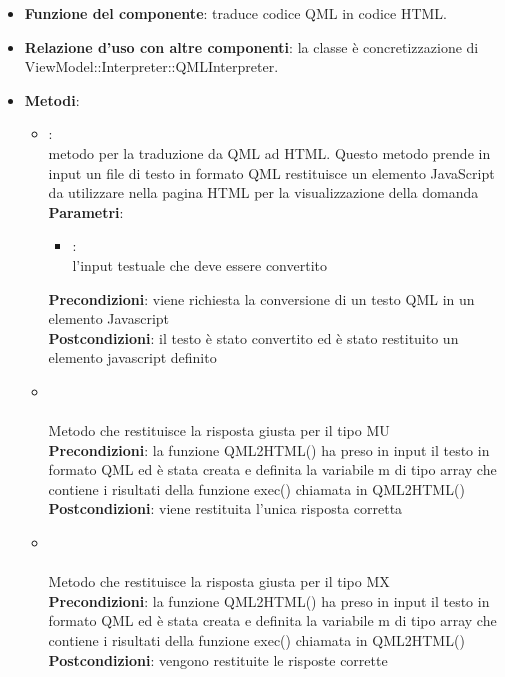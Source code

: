 \begin{itemize}
	\item\textbf{Funzione del componente}: traduce codice QML in codice HTML.
	\item\textbf{Relazione d'uso con altre componenti}: la classe è concretizzazione di\\ ViewModel::Interpreter::QMLInterpreter.\\
	\item\textbf{Metodi}:
	\begin{itemize}
		\item{}:\\
		 metodo per la traduzione da QML ad HTML. Questo metodo prende in input un file di testo in formato QML restituisce un elemento JavaScript da utilizzare nella pagina HTML per la visualizzazione della domanda \\
		\textbf{Parametri}:
			\begin{itemize}
				\item{}:\\
				 l'input testuale che deve essere convertito \\
			\end{itemize}
		\textbf{Precondizioni}: viene richiesta la conversione di un testo QML in un elemento Javascript\\
		\textbf{Postcondizioni}: il testo è stato convertito ed è stato restituito un elemento javascript definito\\
		\item{}\\
		 \\Metodo che restituisce la risposta giusta per il tipo MU\\
		\textbf{Precondizioni}: la funzione QML2HTML() ha preso in input il testo in formato QML ed è stata creata e definita la variabile m di tipo array che contiene i risultati della funzione exec() chiamata in QML2HTML()\\
		\textbf{Postcondizioni}: viene restituita l'unica risposta corretta \\
		
		\item{}\\
		 \\Metodo che restituisce la risposta giusta per il tipo MX\\
		\textbf{Precondizioni}: la funzione QML2HTML() ha preso in input il testo in formato QML ed è stata creata e definita la variabile m di tipo array che contiene i risultati della funzione exec() chiamata in QML2HTML()\\
		\textbf{Postcondizioni}: vengono restituite le risposte corrette \\
		

\end{itemize}
\end{itemize}
